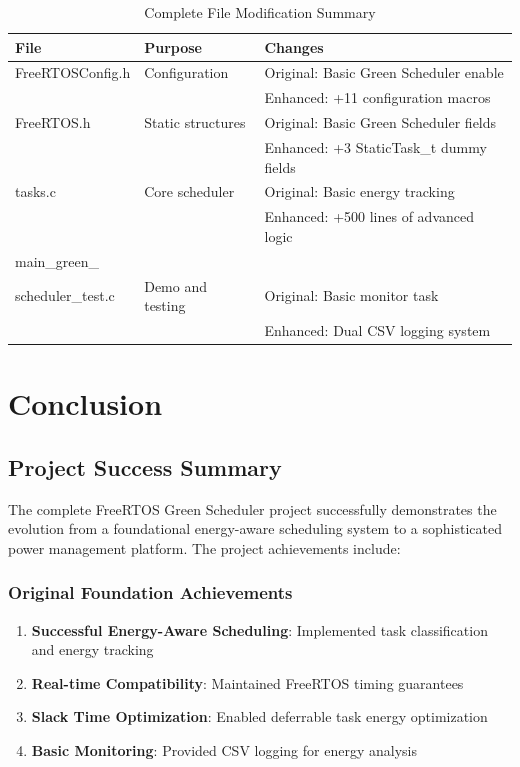 \documentclass[11pt,a4paper]{article}
\begin{document}
\begin{table}[h]
\centering
\begin{tabular}{|p{3cm}|p{4cm}|p{6cm}|}
\hline
\textbf{File} & \textbf{Purpose} & \textbf{Changes} \\
\hline
FreeRTOSConfig.h & Configuration & Original: Basic Green Scheduler enable\\
& & Enhanced: +11 configuration macros \\
\hline
FreeRTOS.h & Static structures & Original: Basic Green Scheduler fields\\
& & Enhanced: +3 StaticTask\_t dummy fields \\
\hline
tasks.c & Core scheduler & Original: Basic energy tracking\\
& & Enhanced: +500 lines of advanced logic \\
\hline
main\_green\_\\scheduler\_test.c & Demo and testing & Original: Basic monitor task\\
& & Enhanced: Dual CSV logging system \\
\hline
\end{tabular}
\caption{Complete File Modification Summary}
\end{table}

\section{Conclusion}

\subsection{Project Success Summary}

The complete FreeRTOS Green Scheduler project successfully demonstrates the evolution from a foundational energy-aware scheduling system to a sophisticated power management platform. The project achievements include:

\subsubsection{Original Foundation Achievements}
\begin{enumerate}
    \item \textbf{Successful Energy-Aware Scheduling}: Implemented task classification and energy tracking
    \item \textbf{Real-time Compatibility}: Maintained FreeRTOS timing guarantees
    \item \textbf{Slack Time Optimization}: Enabled deferrable task energy optimization
    \item \textbf{Basic Monitoring}: Provided CSV logging for energy analysis
\end{enumerate}
\end{document}
